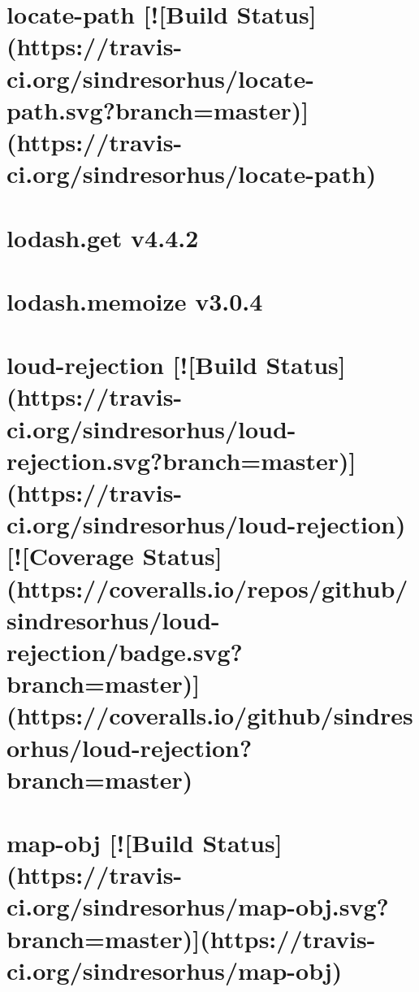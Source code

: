\documentclass[twoside]{book}
\newcommand{\+}{\discretionary{\mbox{\scriptsize$\hookleftarrow$}}{}{}}
\begin{document}
\chapter{locate-\/path \mbox{[}!\mbox{[}Build Status\mbox{]}(https\+://travis-\/ci.org/sindresorhus/locate-\/path.svg?branch=master)\mbox{]}(https\+://travis-\/ci.org/sindresorhus/locate-\/path)}
\label{md_dsmacc_examples_DRmerge_node_modules_locate-path_readme}

\chapter{lodash.\+get v4.4.2}
\label{md_dsmacc_examples_DRmerge_node_modules_lodash_8get_README}

\chapter{lodash.\+memoize v3.0.4}
\label{md_dsmacc_examples_DRmerge_node_modules_lodash_8memoize_README}

\chapter{loud-\/rejection \mbox{[}!\mbox{[}Build Status\mbox{]}(https\+://travis-\/ci.org/sindresorhus/loud-\/rejection.svg?branch=master)\mbox{]}(https\+://travis-\/ci.org/sindresorhus/loud-\/rejection) \mbox{[}!\mbox{[}Coverage Status\mbox{]}(https\+://coveralls.io/repos/github/sindresorhus/loud-\/rejection/badge.svg?branch=master)\mbox{]}(https\+://coveralls.io/github/sindresorhus/loud-\/rejection?branch=master)}
\label{md_dsmacc_examples_DRmerge_node_modules_loud-rejection_readme}

\chapter{map-\/obj \mbox{[}!\mbox{[}Build Status\mbox{]}(https\+://travis-\/ci.org/sindresorhus/map-\/obj.svg?branch=master)\mbox{]}(https\+://travis-\/ci.org/sindresorhus/map-\/obj)}
\label{md_dsmacc_examples_DRmerge_node_modules_map-obj_readme}

\end{document}

